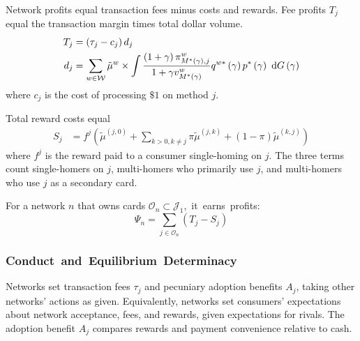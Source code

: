\documentclass[main.tex]{subfiles}
\begin{document}
Network profits equal transaction fees minus costs and rewards.
Fee profits $T_j$ equal the transaction margin times total dollar volume.
\begin{align}
  T_{j} & =\left(\tau_{j}-c_{j}\right) d_j  \label{eq:transaction-fee-profit} \\
  d_j & = \sum_{w\in\mathcal{W}} \tilde{\mu}^w \times\int\frac{\left(1 + \gamma\right)\pi^w_{M^*\left(\gamma\right), j}}{1 + \gamma v^w_{M^*\left(\gamma\right)}}q^{w*}\left(\gamma\right)p^{*}\left(\gamma\right)\mbox{ d} G\left(\gamma\right) \label{eq:dollars}
\end{align}
where $c_{j}$ is the cost of processing $\$1$ on method $j$.

Total reward costs equal
\begin{align}
  S_{j} & =f^{j}\left(\tilde{\mu}^{\left(j,0\right)}+\sum_{k>0,k\neq j}\pi\tilde{\mu}^{\left(j,k\right)}+\left(1-\pi\right)\tilde{\mu}^{\left(k,j\right)}\right)\label{eq:subsidy-bill}
  \end{align}
where $f^{j}$ is the reward paid to a consumer single-homing on $j$.
The three terms count single-homers on $j$, multi-homers who primarily use $j$, and multi-homers who use $j$ as a secondary card.

For a network $n$ that owns cards $\mathcal{O}_{n}\subset\mathcal{J}_{1}$,~it~earns~profits:
\begin{equation} \Psi_{n}=\sum_{j\in\mathcal{O}_{n}}\left(T_{j}-S_{j}\right)\label{eq:profit-sum} 
\end{equation}

\subsubsection{Conduct~and~Equilibrium~Determinacy}
\label{subsubsec:conduct-eqm}

Networks set transaction fees $\tau_j$ and pecuniary adoption benefits $A_j$, taking other networks' actions as given.
Equivalently, networks set consumers' expectations about network acceptance, fees, and rewards, given expectations for rivals.
The adoption benefit $A_j$ compares rewards and payment convenience relative to cash.
\end{document}
